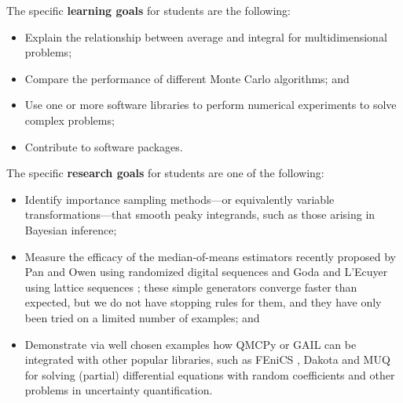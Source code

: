 The specific {\bf learning goals} for students are the following:
\begin{itemize}[leftmargin=.5cm]
    \item Explain the relationship between average and integral for multidimensional problems;
    \item Compare the performance of different Monte Carlo algorithms; and
    \item Use one or more software libraries to perform numerical experiments to solve  complex problems;
    \item Contribute to software packages.
\end{itemize}
The specific {\bf research goals} for students are one of the following:
\begin{itemize}[leftmargin=.5cm]
\item Identify importance sampling methods---or equivalently variable transformations---that smooth peaky integrands, such as those arising in Bayesian inference;

\item Measure the efficacy of the median-of-means estimators recently proposed by Pan and Owen using randomized digital sequences \cite{SPAMOM22} and Goda and L'Ecuyer using  lattice sequences
\cite{CFMQMC}; these simple generators converge faster than expected, but we do not have stopping rules for them, and they have only been tried on a limited number of examples; and 

\item Demonstrate via well chosen examples how QMCPy or GAIL can be integrated with other popular libraries, such as FEniCS \cite{AlnaesEtal2015,LoggEtal_11_2012}, Dakota \cite{DakotaUsersManual} and MUQ \cite{MUQ} for solving (partial) differential equations with random coefficients and other problems in uncertainty quantification.
\end{itemize}